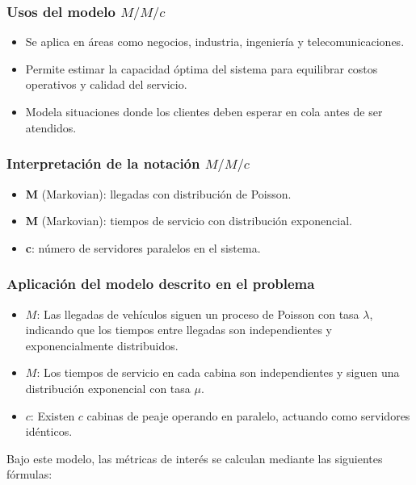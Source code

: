 \documentclass[12pt]{article}
\begin{document}
\subsubsection*{Usos del modelo $M/M/c$}
\begin{itemize}
    \item Se aplica en áreas como negocios, industria, ingeniería y telecomunicaciones.
    \item Permite estimar la capacidad óptima del sistema para equilibrar costos operativos y calidad del servicio.
    \item Modela situaciones donde los clientes deben esperar en cola antes de ser atendidos.
\end{itemize}

\subsubsection*{Interpretación de la notación $M/M/c$}
\begin{itemize}
    \item \textbf{M} (Markovian): llegadas con distribución de Poisson.
    \item \textbf{M} (Markovian): tiempos de servicio con distribución exponencial.
    \item \textbf{c}: número de servidores paralelos en el sistema.
\end{itemize}

\subsubsection{Aplicación del modelo descrito en el problema }
    
    \begin{itemize}
        \item \( M \): Las llegadas de vehículos siguen un proceso de Poisson con tasa \( \lambda \), indicando que los tiempos entre llegadas son independientes y exponencialmente distribuidos.
        \item \( M \): Los tiempos de servicio en cada cabina son independientes y siguen una distribución exponencial con tasa \( \mu \).
        \item \( c \): Existen \( c \) cabinas de peaje operando en paralelo, actuando como servidores idénticos.
    \end{itemize}
    
    Bajo este modelo, las métricas de interés se calculan mediante las siguientes fórmulas:
    
\end{document}
